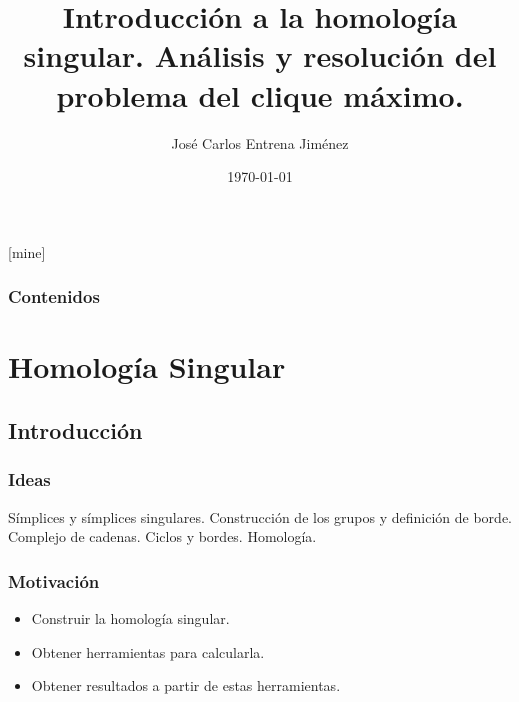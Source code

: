 \documentclass{beamer}
\title[Homología Singular. Problema del clíque máximo.]{Introducción a la homología singular. Análisis y resolución del problema del clique máximo.} %
\author{José Carlos Entrena Jiménez} %
\institute[UGR] %
{
  Universidad de Granada \\ %
  \medskip
  \textit{jentrena@correo.ugr.es} %
}
\date{\today} %
\begin{document}
[mine]

\frame{\titlepage}

\begin{frame}
  \frametitle{Contenidos} %
  \tableofcontents
\end{frame}



\section{Homología Singular} %

\subsection{Introducción} %

\begin{frame}
\frametitle{Ideas}

Símplices y símplices singulares. Construcción de los grupos y definición de borde. Complejo de cadenas.
Ciclos y bordes. Homología.

\end{frame}


\begin{frame}
  \frametitle{Motivación}
  \begin{itemize}
    \item Construir la homología singular.
    \item Obtener herramientas para calcularla.
    \item Obtener resultados a partir de estas herramientas.
  \end{itemize}

\end{frame}
\end{document}
